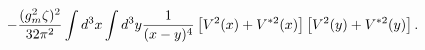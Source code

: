 \begin{equation}
-\frac{(g_m^2\zeta)^2}{32\pi^2}\int d^3x\int
d^3y{1\over(x-y)^4}\left[V^2(x)+V^{*2}(x)\right]\left[V^2(y)+V^{*2}(y)\right].
\end{equation}

